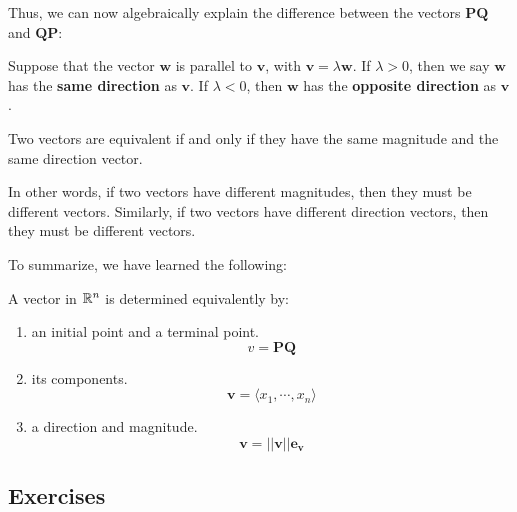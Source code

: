 Thus, we can now algebraically explain the difference between the vectors $\bm{PQ}$ and $\bm{QP}$:

\begin{definition}
Suppose that the vector $\bm{w}$ is parallel to $\bm{v}$, with $\bm{v} = \lambda \bm{w}$.  If $\lambda > 0$, then we say $\bm{w}$ has the \textbf{same direction} as $\bm{v}$.  If $\lambda < 0$, then $\bm{w}$ has the \textbf{opposite direction} as $\bm{v}$.
\end{definition}



\begin{proposition}
    Two vectors are equivalent if and only if they have the same magnitude and the same direction vector.
\end{proposition}


In other words, if two vectors have different magnitudes, then they must be different vectors.  Similarly, if two vectors have different direction vectors, then they must be different vectors.

To summarize, we have learned the following:

    \begin{example}
    
    A vector in $\mathbb{R}^n$ is determined equivalently by:
    
    \begin{enumerate}
        \item an initial point and a terminal point. $$v = \bm{PQ}$$
        \item its components. $$\bm{v} = \langle x_1, \cdots, x_n \rangle$$
        \item a direction and magnitude. $$\bm{v} = ||\bm{v}||\bm{e_v}$$
    \end{enumerate}
    \end{example}
















\subsection{Exercises}

